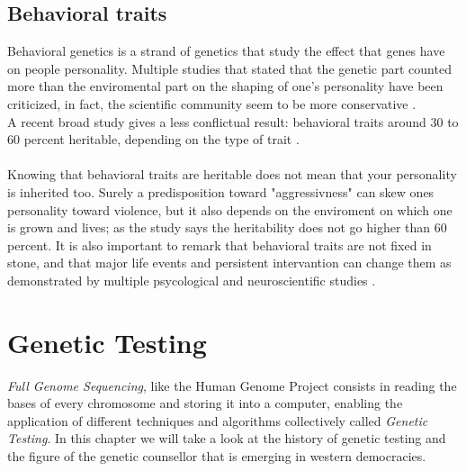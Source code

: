 \documentclass[12pt]{article}
\begin{document}
\subsection{Behavioral traits}
Behavioral genetics is a strand of genetics that study the effect that genes have on people personality. Multiple studies that stated that the genetic part counted more than the enviromental part on the shaping of one's personality have been criticized, in fact, the scientific community seem to be more conservative \cite{personality_genetic}.\\
A recent broad study gives a less conflictual result: behavioral traits around 30 to 60 percent heritable, depending on the type of trait \cite{behavioral_genetics_nature}.\\
\\
Knowing that behavioral traits are heritable does not mean that your personality is inherited too. Surely a predisposition toward "aggressivness" can skew ones personality toward violence, but it also depends on the enviroment on which one is grown and lives; as the study says the heritability does not go higher than 60 percent. It is also important to remark that behavioral traits are not fixed in stone, and that major life events and persistent intervantion can change them 
as demonstrated by multiple psycological and neuroscientific studies \cite{personality_change}.

\newpage
\section{Genetic Testing}

\emph{Full Genome Sequencing}, like the Human Genome Project \cite{human_genome_project} consists in reading the bases of every chromosome and storing it into a computer, enabling the application of different techniques and 
algorithms collectively called \emph{Genetic Testing}. In this chapter we will take a look at the history of genetic testing and the figure of the genetic counsellor that is emerging in western democracies.\\
\label{sec:genetic_testing}
\end{document}
